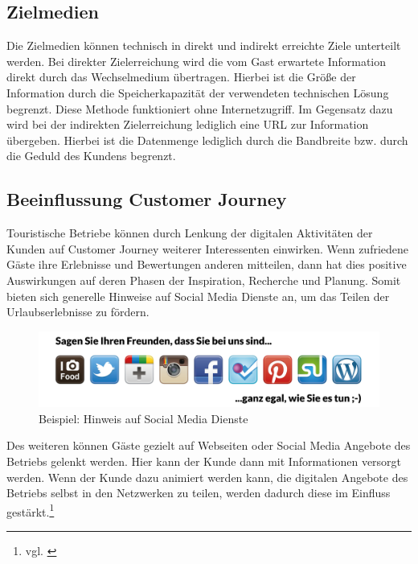 \subsection{Zielmedien} %
\label{sub:zielmedien}
Die Zielmedien können technisch in direkt und indirekt erreichte Ziele unterteilt werden. Bei direkter Zielerreichung wird die vom Gast erwartete Information direkt durch das Wechselmedium übertragen. Hierbei ist die Größe der Information durch die Speicherkapazität der verwendeten technischen Lösung begrenzt. Diese Methode funktioniert ohne Internetzugriff.  Im Gegensatz dazu wird bei der indirekten Zielerreichung lediglich eine \ac{URL} zur Information übergeben. Hierbei ist die Datenmenge lediglich durch die Bandbreite bzw. durch die Geduld des Kundens begrenzt.

\subsection{Beeinflussung Customer Journey} %
\label{sub:beeinflussung_customer_journey}
Touristische Betriebe können durch Lenkung der digitalen Aktivitäten der Kunden auf Customer Journey weiterer Interessenten einwirken. Wenn zufriedene Gäste ihre Erlebnisse und Bewertungen anderen mitteilen, dann hat dies positive Auswirkungen auf deren Phasen der Inspiration, Recherche und Planung. Somit bieten sich generelle Hinweise auf Social Media Dienste an, um das Teilen der Urlaubserlebnisse zu fördern. 

\begin{figure}[H]
\begin{center}
\includegraphics[width=.8\textwidth]{zielcj.jpg}
\caption[Beispiel: Hinweis auf Social Media Dienste]{Beispiel: Hinweis auf Social Media Dienste\protect\footnotemark}
\label{pic:zielcj}
\end{center}
\end{figure}

Des weiteren können Gäste gezielt auf Webseiten oder Social Media Angebote des Betriebs gelenkt werden. Hier kann der Kunde dann mit Informationen versorgt werden. Wenn der Kunde dazu animiert werden kann, die digitalen Angebote des Betriebs selbst in den Netzwerken zu teilen, werden dadurch diese im Einfluss gestärkt.\footnote{vgl. \cite{fb:news}}

